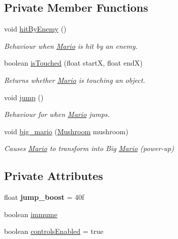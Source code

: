 \subsection*{Private Member Functions}
\begin{DoxyCompactItemize}
\item 
void \hyperlink{classnl_1_1arjanfrans_1_1mario_1_1model_1_1Mario_a5f5b797929d57a1f55a39e1312c98c64}{hit\+By\+Enemy} ()
\begin{DoxyCompactList}\small\item\em Behaviour when \hyperlink{classnl_1_1arjanfrans_1_1mario_1_1model_1_1Mario}{Mario} is hit by an enemy. \end{DoxyCompactList}\item 
boolean \hyperlink{classnl_1_1arjanfrans_1_1mario_1_1model_1_1Mario_ab9f4a29d9ada92deaf71cc9bf7f09ebe}{is\+Touched} (float startX, float endX)
\begin{DoxyCompactList}\small\item\em Returns whether \hyperlink{classnl_1_1arjanfrans_1_1mario_1_1model_1_1Mario}{Mario} is touching an object. \end{DoxyCompactList}\item 
void \hyperlink{classnl_1_1arjanfrans_1_1mario_1_1model_1_1Mario_aa31ff544aeab7ea01d0cdb54ba31a86b}{jump} ()
\begin{DoxyCompactList}\small\item\em Behaviour for when \hyperlink{classnl_1_1arjanfrans_1_1mario_1_1model_1_1Mario}{Mario} jumps. \end{DoxyCompactList}\item 
void \hyperlink{classnl_1_1arjanfrans_1_1mario_1_1model_1_1Mario_a002115bd2f3f057d21ec38f4f5cfa833}{big\+\_\+mario} (\hyperlink{classnl_1_1arjanfrans_1_1mario_1_1model_1_1Mushroom}{Mushroom} mushroom)
\begin{DoxyCompactList}\small\item\em Causes \hyperlink{classnl_1_1arjanfrans_1_1mario_1_1model_1_1Mario}{Mario} to transform into Big \hyperlink{classnl_1_1arjanfrans_1_1mario_1_1model_1_1Mario}{Mario} (power-\/up) \end{DoxyCompactList}\end{DoxyCompactItemize}
\subsection*{Private Attributes}
\begin{DoxyCompactItemize}
\item 
\mbox{\label{classnl_1_1arjanfrans_1_1mario_1_1model_1_1Mario_ac2312d3439230c4f7451af3ea5c7fc90}} 
float {\bfseries jump\+\_\+boost} = 40f
\item 
boolean \hyperlink{classnl_1_1arjanfrans_1_1mario_1_1model_1_1Mario_a09b83e0286895f31f33418883c06ce01}{immume}
\item 
boolean \hyperlink{classnl_1_1arjanfrans_1_1mario_1_1model_1_1Mario_a5274108ef60b357abdca2e64b6378d58}{controls\+Enabled} = true
\end{DoxyCompactItemize}


